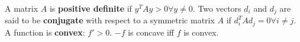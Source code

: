 A matrix $A$ is \textbf{positive definite} if $y^T A y > 0 \forall y \neq 0$.
Two vectors $d_i$ and $d_j$ are said to be \textbf{conjugate} with respect to a symmetric matrix $A$ if $d_i^T Ad_j = 0 \forall i \neq j$.
A function is \textbf{convex}: $f'>0$. $-f$ is concave iff $f$ is convex.